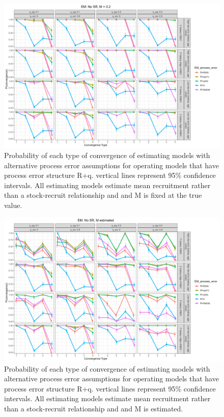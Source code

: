 \documentclass[
  12pt,
]{article}
\begin{document}
\begin{landscape}
\begin{figure}
\caption{Probability of each type of convergence of estimating models with alternative process error assumptions for operating models that have process error structure R+q. vertical lines represent 95\% confidence intervals. All estimating models estimate mean recruitment rather than a stock-recruit relationship and and M is fixed at the true value.}\label{q_om_em_R_MF_convergence}
\begin{center}
\includegraphics[width = \textwidth]{q_om_p_convergence_meanR_M_fixed.png}
\end{center}
\end{figure}
\end{landscape}

\begin{landscape}
\begin{figure}
\caption{Probability of each type of convergence of estimating models with alternative process error assumptions for operating models that have process error structure R+q. vertical lines represent 95\% confidence intervals. All estimating models estimate mean recruitment rather than a stock-recruit relationship and and M is estimated.}\label{q_om_em_R_ME_convergence}
\begin{center}
\includegraphics[width = \textwidth]{q_om_p_convergence_meanR_M_estimated.png}
\end{center}
\end{figure}
\end{landscape}
\end{document}
